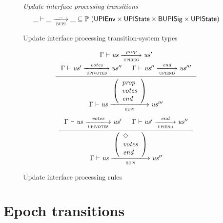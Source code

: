 \documentclass[11pt,a4paper]{article}
\newcommand{\powerset}[1]{\mathbb{P}~#1}
\newcommand{\var}[1]{\mathit{#1}}
\newcommand{\trans}[2]{\xlongrightarrow[\textsc{#1}]{#2}}
\newcommand{\Nothing}{\Diamond}
\begin{document}
\begin{figure}[ht]
  \emph{Update interface processing transitions}
  \begin{equation*}
    \_ \vdash \var{\_} \trans{bupi}{\_} \var{\_} \subseteq
    \powerset (\UPIEnv \times \UPIState \times \Bupisig \times \UPIState)
  \end{equation*}
  \caption{Update interface processing transition-system types}
  \label{fig:ts-types:bupi}
\end{figure}

\begin{figure}[ht]
  \begin{equation*}
    \inference
    { \Gamma \vdash \var{us} \trans{upireg}{\var{prop}} \var{us'}
      \\
      \Gamma \vdash \var{us'} \trans{upivotes}{\var{votes}} \var{us''}
      &
      \Gamma \vdash \var{us''} \trans{upiend}{\var{end}} \var{us'''}
    }
    {
      \Gamma \vdash
      {\var{us}}
      \trans{bupi}
      {
        \left(
          \begin{array}{l}
            \var{prop} \\
            \var{votes} \\
            \var{end}
          \end{array}
        \right)
      }
      {\var{us'''}}
    }
  \end{equation*}
  \vspace{20pt}
  \begin{equation*}
    \inference
    { \Gamma \vdash \var{us} \trans{upivotes}{\var{votes}} \var{us'}
      &
      \Gamma \vdash \var{us'} \trans{upiend}{\var{end}} \var{us''}
    }
    {
      \Gamma \vdash \var{us}
      \trans{bupi}{
        \left(
          \begin{array}{l}
            \Nothing \\
            \var{votes} \\
            \var{end}
          \end{array}
        \right)
      }
      \var{us''}
    }
  \end{equation*}
  \caption{Update interface processing rules}
  \label{fig:rules:bupi}
\end{figure}

\clearpage

\section{Epoch transitions}
\end{document}
